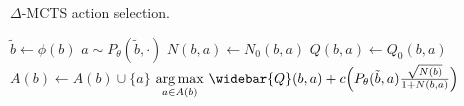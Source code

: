 \begin{algorithm}[H]
    \caption{$\Delta$-MCTS action selection.}
    \label{alg:delta-zero-selection}
    \begin{algorithmic}[1]
            \State $\tilde{b} \leftarrow \phi(b)$
             
                \State $a \sim P_\theta(\tilde{b}, \cdot)$ 
                    \State $N(b,a) \leftarrow N_0(b,a)$
                    \State $Q(b,a) \leftarrow Q_0(b,a)$ \label{line:delta_mcts_init_q}
                    \State {}
                    \State {} 
                    \State {}
                    \State $A(b) \leftarrow A(b) \cup \{a\}$
                \EndIf
            \EndIf
            \State \Return $\argmax\limits_{a \in A(b)}\, \widebar{Q}(b,a) + c\Big(P_\theta(\tilde{b},a)\frac{\sqrt{N(b)}}{1{+}N(b,a)}\Big)$ 
            \State \phantom{\Return} 
        \EndFunction
    \end{algorithmic}
\end{algorithm}
